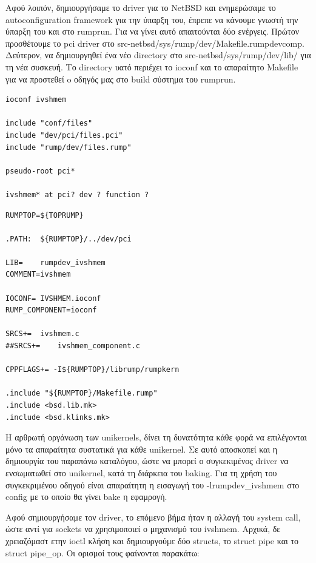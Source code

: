 Αφού λοιπόν, δημιουργήσαμε το driver για το NetBSD και ενημερώσαμε το
autoconfiguration framework για την ύπαρξη του, έπρεπε να κάνουμε γνωστή την
ύπαρξη του και στο rumprun. Για να γίνει αυτό απαιτούνται δύο ενέργεις. Πρώτον
προσθέτουμε το pci driver στο src-netbsd/sys/rump/dev/Makefile.rumpdevcomp.
Δεύτερον, να δημιουργηθεί ένα νέο directory στο src-netbsd/sys/rump/dev/lib/ για
τη νέα συσκευή. Το directory υατό περιέχει το ioconf και το απαραίτητο Makefile
για να προστεθεί o οδηγός μας στο build σύστημα του rumprun. 

\begin{lstlisting}[caption={IVSHMEM.ioconf},captionpos=b]
ioconf ivshmem

include "conf/files"
include "dev/pci/files.pci"
include "rump/dev/files.rump"

pseudo-root pci*

ivshmem* at pci? dev ? function ?
\end{lstlisting}

\begin{lstlisting}[caption={rumprun Makefile για το ivshmem},captionpos=b]
RUMPTOP=${TOPRUMP}

.PATH:	${RUMPTOP}/../dev/pci

LIB=	rumpdev_ivshmem
COMMENT=ivshmem

IOCONF=	IVSHMEM.ioconf
RUMP_COMPONENT=ioconf

SRCS+=	ivshmem.c
##SRCS+=	ivshmem_component.c

CPPFLAGS+= -I${RUMPTOP}/librump/rumpkern

.include "${RUMPTOP}/Makefile.rump"
.include <bsd.lib.mk>
.include <bsd.klinks.mk>
\end{lstlisting}

Η αρθρωτή οργάνωση των unikernels, δίνει τη δυνατότητα κάθε φορά να επιλέγονται
μόνο τα απαραίτητα συστατικά για κάθε unikernel. Σε αυτό αποσκοπεί και η
δημιουργία του παραπάνω καταλόγου, ώστε να μπορεί ο συγκεκιμένος driver να
ενσωματωθεί στο unikernel, κατά τη διάρκεια του baking. Για τη χρήση του
συγκεκριμένου οδηγού είναι απαραίτητη η εισαγωγή του -lrumpdev\_ivshmem στο
config με το οποίο θα γίνει bake η εφαμρογή. 

Αφού σημιουργήσαμε τον driver, το επόμενο βήμα ήταν η αλλαγή του system call,
ώστε αντί για sockets να χρησιμοποιεί ο μηχανισμό του ivshmem. Αρχικά, δε
χρειαζόμαστ ετην ioctl κλήση και δημιουργούμε δύο structs, το struct pipe και το
struct pipe\_op. Οι ορισμοί τους φαίνονται παρακάτω:

